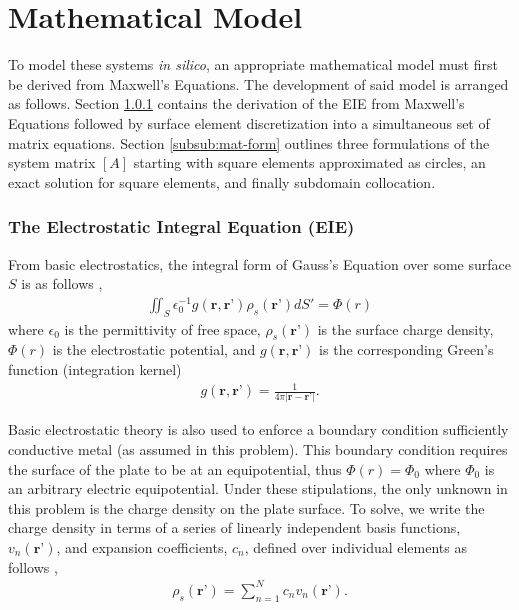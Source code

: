 \section{Mathematical Model}
\label{sec:mathmod}

To model these systems \textit{in silico}, an appropriate mathematical model must first be derived from Maxwell's Equations. The development of said model is arranged as follows. Section \ref{subsub:eie} contains the derivation of the EIE from Maxwell's Equations followed by surface element discretization into a simultaneous set of matrix equations. Section \ref{subsub:mat-form} outlines three formulations of the system matrix $[A]$ starting with square elements approximated as circles, an exact solution for square elements, and finally subdomain collocation. 

\subsubsection{The Electrostatic Integral Equation (EIE)}
\label{subsub:eie}
From basic electrostatics, the integral form of Gauss's Equation over some surface $S$ is as follows \cite{rothlecnotes}, \cite{jin2011theory}
\begin{align}
    \iint_S\epsilon_0^{-1}g(\textbf{r},\textbf{r'})\rho_s(\textbf{r'})dS'=\Phi(r)
    \label{eq:Gauss}
\end{align}
where $\epsilon_0$ is the permittivity of free space, $\rho_s(\textbf{r'})$ is the surface charge density, $\Phi(r)$ is the electrostatic potential, and $g(\textbf{r},\textbf{r'})$ is the corresponding Green's function (integration kernel)
\begin{align}
    g(\textbf{r},\textbf{r'})=\frac{1}{4\pi|\textbf{r}-\textbf{r'}|}.
    \label{eq:greemn}
\end{align}

Basic electrostatic theory is also used to enforce a boundary condition sufficiently conductive metal (as assumed in this problem). This boundary condition requires the surface of the plate to be at an equipotential, thus $\Phi(r)=\Phi_0$ where $\Phi_0$ is an arbitrary electric equipotential. Under these stipulations, the only unknown in this problem is the charge density on the plate surface. To solve, we write the charge density in terms of a series of linearly independent basis functions, $v_n(\textbf{r'})$, and expansion coefficients, $c_n$, defined over individual elements as follows \cite{rothlecnotes}, \cite{jin2011theory}
\begin{align}
    \rho_s(\textbf{r'})=\sum_{n=1}^{N}c_nv_n(\textbf{r'}).
    \label{eq:rho_expansion}
\end{align}


